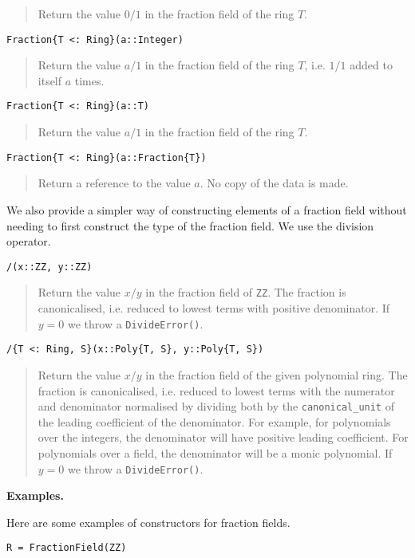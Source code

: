 \documentclass[a4paper,10pt]{article}
\newcommand{\code}{\lstinline}
\newcommand{\desc}[1]{\vspace{-3mm}\begin{quote}#1\end{quote}}
\begin{document}
{{\desc{Return the value $0/1$ in the fraction field of the ring $T$.}

\begin{lstlisting}
Fraction{T <: Ring}(a::Integer)
\end{lstlisting}

\desc{Return the value $a/1$ in the fraction field of the ring $T$, i.e.
$1/1$ added to itself $a$ times.}

\begin{lstlisting}
Fraction{T <: Ring}(a::T)
\end{lstlisting}

\desc{Return the value $a/1$ in the fraction field of the ring $T$.}

\begin{lstlisting}
Fraction{T <: Ring}(a::Fraction{T})
\end{lstlisting}

\desc{Return a reference to the value $a$. No copy of the data is made.}

We also provide a simpler way of constructing elements of a fraction field
without needing to first construct the type of the fraction field. We use
the division operator.

\begin{lstlisting}
/(x::ZZ, y::ZZ)
\end{lstlisting}

\desc{Return the value $x/y$ in the fraction field of \code{ZZ}. The fraction
is canonicalised, i.e. reduced to lowest terms with positive denominator. If
$y = 0$ we throw a \code{DivideError()}.}

\begin{lstlisting}
/{T <: Ring, S}(x::Poly{T, S}, y::Poly{T, S})
\end{lstlisting}

\desc{Return the value $x/y$ in the fraction field of the given polynomial
ring. The fraction is canonicalised, i.e. reduced to lowest terms with the
numerator and denominator normalised by dividing both by the
\code{canonical_unit} of the leading coefficient of the denominator. For
example, for polynomials over the integers, the denominator will have
positive leading coefficient. For polynomials over a field, the denominator
will be a monic polynomial. If $y = 0$ we throw a \code{DivideError()}.}

\textbf{Examples.}

Here are some examples of constructors for fraction fields.

\begin{lstlisting}
R = FractionField(ZZ)


\end{lstlisting}}}
\end{document}
